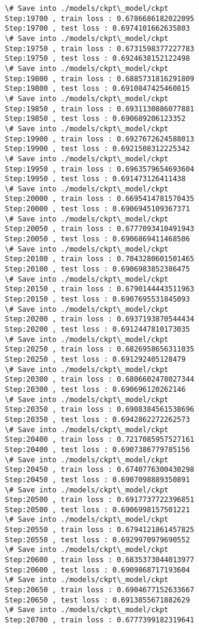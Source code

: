 \documentclass[11pt]{article}
\begin{document}
\begin{Verbatim}[commandchars=\\\{\}]
\# Save into ./models/ckpt\_model/ckpt
Step:19700 , train loss : 0.6786686182022095
Step:19700 , test loss : 0.6974101662635803
\# Save into ./models/ckpt\_model/ckpt
Step:19750 , train loss : 0.6731598377227783
Step:19750 , test loss : 0.6924638152122498
\# Save into ./models/ckpt\_model/ckpt
Step:19800 , train loss : 0.6885731816291809
Step:19800 , test loss : 0.6910847425460815
\# Save into ./models/ckpt\_model/ckpt
Step:19850 , train loss : 0.6931130886077881
Step:19850 , test loss : 0.690689206123352
\# Save into ./models/ckpt\_model/ckpt
Step:19900 , train loss : 0.6927672624588013
Step:19900 , test loss : 0.6921508312225342
\# Save into ./models/ckpt\_model/ckpt
Step:19950 , train loss : 0.6963579654693604
Step:19950 , test loss : 0.691473126411438
\# Save into ./models/ckpt\_model/ckpt
Step:20000 , train loss : 0.6695414781570435
Step:20000 , test loss : 0.6906945109367371
\# Save into ./models/ckpt\_model/ckpt
Step:20050 , train loss : 0.6777093410491943
Step:20050 , test loss : 0.6906869411468506
\# Save into ./models/ckpt\_model/ckpt
Step:20100 , train loss : 0.7043280601501465
Step:20100 , test loss : 0.6906983852386475
\# Save into ./models/ckpt\_model/ckpt
Step:20150 , train loss : 0.6790144443511963
Step:20150 , test loss : 0.6907695531845093
\# Save into ./models/ckpt\_model/ckpt
Step:20200 , train loss : 0.6937193870544434
Step:20200 , test loss : 0.6912447810173035
\# Save into ./models/ckpt\_model/ckpt
Step:20250 , train loss : 0.6826958656311035
Step:20250 , test loss : 0.691292405128479
\# Save into ./models/ckpt\_model/ckpt
Step:20300 , train loss : 0.6806602478027344
Step:20300 , test loss : 0.690696120262146
\# Save into ./models/ckpt\_model/ckpt
Step:20350 , train loss : 0.6908384561538696
Step:20350 , test loss : 0.6942862272262573
\# Save into ./models/ckpt\_model/ckpt
Step:20400 , train loss : 0.7217085957527161
Step:20400 , test loss : 0.6907386779785156
\# Save into ./models/ckpt\_model/ckpt
Step:20450 , train loss : 0.6740776300430298
Step:20450 , test loss : 0.6907098889350891
\# Save into ./models/ckpt\_model/ckpt
Step:20500 , train loss : 0.6917737722396851
Step:20500 , test loss : 0.6906998157501221
\# Save into ./models/ckpt\_model/ckpt
Step:20550 , train loss : 0.6794121861457825
Step:20550 , test loss : 0.6929970979690552
\# Save into ./models/ckpt\_model/ckpt
Step:20600 , train loss : 0.6835373044013977
Step:20600 , test loss : 0.6909868717193604
\# Save into ./models/ckpt\_model/ckpt
Step:20650 , train loss : 0.6904677152633667
Step:20650 , test loss : 0.6913855671882629
\# Save into ./models/ckpt\_model/ckpt
Step:20700 , train loss : 0.6777399182319641

\end{Verbatim}
\end{document}
